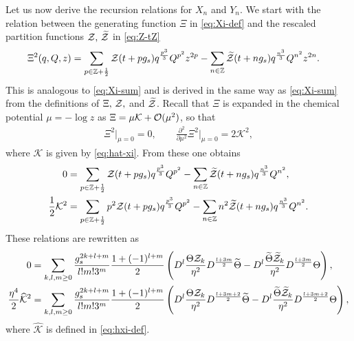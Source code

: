 \documentclass[11pt]{article}
\def\h#1{\widehat{#1}}
\renewcommand{\[}{\begin{eqnarray}}
\renewcommand{\]}{\end{eqnarray}}
\newcommand{\bbZ}{{\mathbb Z}}
\newcommand{\Zeven}{{\cal Z}}
\newcommand{\Zodd}{{\widetilde{\cal Z}}}
\newcommand{\Thetaeven}{\Theta}
\newcommand{\Thetaodd}{{\widetilde{\Theta}}}
\begin{document}
Let us now derive the recursion relations for $X_n$ and $Y_n$.
We start with the relation between the generating function $\Xi$
in \eqref{eq:Xi-def} 
and the rescaled partition functions $\Zeven,\,\Zodd$ in \eqref{eq:Z-tZ}
%
\begin{align}
\Xi^2(q,Q,z)
&=\sum_{p\in\bbZ+\frac{1}{2}}
  \Zeven(t+p g_s)q^{\frac{p^3}{3}}Q^{p^2}z^{2p}
 -\sum_{n\in\bbZ}
  \Zodd(t+n g_s)q^{\frac{n^3}{3}}Q^{n^2}z^{2n}.
\end{align}
%
This is analogous to \eqref{eq:Xi-sum} and is derived
in the same way as \eqref{eq:Xi-sum} from the definitions of 
$\Xi,\,\Zeven,$ and $\Zodd$.
Recall that $\Xi$ is expanded in the chemical potential $\mu=-\log z$
as $\Xi=\mu\mathcal{K}+{\cal O}(\mu^2)$, so that
%
\begin{align}
\Xi^2\Big|_{\mu=0}=0,\qquad
\frac{\partial^2}{\partial\mu^2}\Xi^2\Big|_{\mu=0}=2\mathcal{K}^2,
\end{align}
where $\mathcal{K}$ is given by \eqref{eq:hat-xi}.
%
From these one obtains
%
\begin{align}
0&=
\sum_{p\in\bbZ+\frac{1}{2}}
  \Zeven(t+pg_s)q^{\frac{p^3}{3}}Q^{p^2}
 -\sum_{n\in\bbZ}
  \Zodd(t+ng_s)q^{\frac{n^3}{3}}Q^{n^2},\\
\frac{1}{2}\mathcal{K}^2&=
\sum_{p\in\bbZ+\frac{1}{2}}
  p^2\Zeven(t+pg_s)q^{\frac{p^3}{3}}Q^{p^2}
 -\sum_{n\in\bbZ}
  n^2\Zodd(t+ng_s)q^{\frac{n^3}{3}}Q^{n^2}.
\end{align}
%
These relations are rewritten as
%
\begin{align}
\label{ZeoRecExp1}
0&=
 \sum_{k,l,m\ge 0}\frac{g_s^{2k+l+m}}{l!m!3^m}
 \frac{1+(-1)^{l+m}}{2}\left(
  D^l\frac{\Thetaeven\Zeven_k}{\eta^2}
  D^{\frac{l+3m}{2}}\Thetaodd
 -D^l\frac{\Thetaodd\Zodd_k}{\eta^2}
  D^{\frac{l+3m}{2}}\Thetaeven
 \right),\\
\frac{\eta^4}{2}\h{\mathcal{K}}^2
\label{ZeoRecExp2}
&=
 \sum_{k,l,m\ge 0}\frac{g_s^{2k+l+m}}{l!m!3^m}
 \frac{1+(-1)^{l+m}}{2}\left(
  D^l\frac{\Thetaeven\Zeven_k}{\eta^2}
  D^{\frac{l+3m+2}{2}}\Thetaodd
 -D^l\frac{\Thetaodd\Zodd_k}{\eta^2}
  D^{\frac{l+3m+2}{2}}\Thetaeven
 \right),
\end{align}
where $\h{\mathcal{K}}$ is defined in \eqref{eq:hxi-def}.
%
\end{document}
